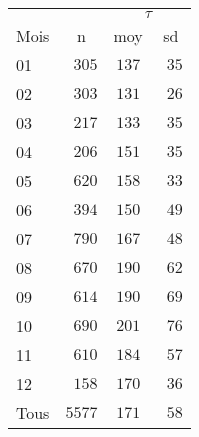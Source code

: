 \begin{tabular}{lccc}
\toprule
 &  & \multicolumn{2}{c}{$\tau$} \\ \cmidrule(lr){3-4}
Mois  & n & moy & \multicolumn{1}{c}{sd} \\ 
\midrule
01  & $\phantom{0}305$ & $137$ & $\phantom{0}35$ \\
02  & $\phantom{0}303$ & $131$ & $\phantom{0}26$ \\
03  & $\phantom{0}217$ & $133$ & $\phantom{0}35$ \\
04  & $\phantom{0}206$ & $151$ & $\phantom{0}35$ \\
05  & $\phantom{0}620$ & $158$ & $\phantom{0}33$ \\
06  & $\phantom{0}394$ & $150$ & $\phantom{0}49$ \\
07  & $\phantom{0}790$ & $167$ & $\phantom{0}48$ \\
08  & $\phantom{0}670$ & $190$ & $\phantom{0}62$ \\
09  & $\phantom{0}614$ & $190$ & $\phantom{0}69$ \\
10  & $\phantom{0}690$ & $201$ & $\phantom{0}76$ \\
11  & $\phantom{0}610$ & $184$ & $\phantom{0}57$ \\
12  & $\phantom{0}158$ & $170$ & $\phantom{0}36$ \\
Tous  & $5577$ & $171$ & $\phantom{0}58$ \\
\bottomrule 
\end{tabular}
